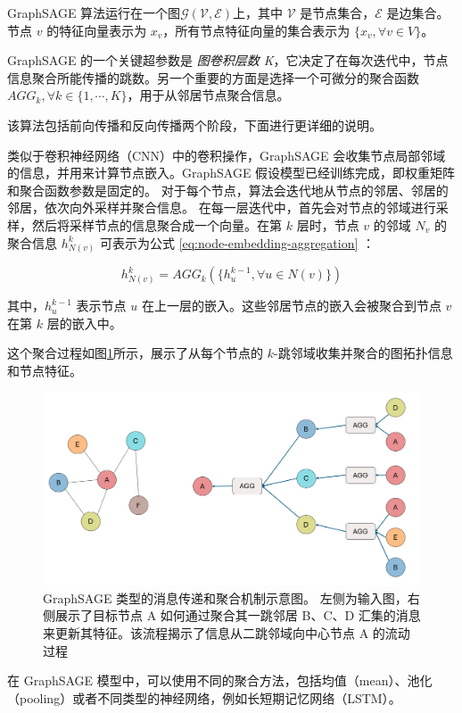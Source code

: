 \documentclass{article}
\begin{document}
GraphSAGE 算法运行在一个图$\mathcal{G(V, E)}$上，其中 $\mathcal{V}$ 是节点集合，$\mathcal{E}$ 是边集合。节点 $v$ 的特征向量表示为 $x_v$，所有节点特征向量的集合表示为 $\{x_v, \forall v \in V\}$。

GraphSAGE 的一个关键超参数是 \textit{图卷积层数 K}，它决定了在每次迭代中，节点信息聚合所能传播的跳数。另一个重要的方面是选择一个可微分的聚合函数$AGG_k,\forall k \in \{1,\cdots,K\}$，用于从邻居节点聚合信息。

该算法包括前向传播和反向传播两个阶段，下面进行更详细的说明。

类似于卷积神经网络（CNN）中的卷积操作，GraphSAGE 会收集节点局部邻域的信息，并用来计算节点嵌入。GraphSAGE 假设模型已经训练完成，即权重矩阵和聚合函数参数是固定的。
对于每个节点，算法会迭代地从节点的邻居、邻居的邻居，依次向外采样并聚合信息。
在每一层迭代中，首先会对节点的邻域进行采样，然后将采样节点的信息聚合成一个向量。在第 $k$ 层时，节点 $v$ 的邻域 $N_v$ 的聚合信息 $h_{N(v)}^k$ 可表示为公式 \eqref{eq:node-embedding-aggregation} \cite{Kumar2020}：

\begin{equation}
 h_{N(v)}^k=AGG_k (\{h_u^{k-1},\forall u \in N(v)\})
 \label{eq:node-embedding-aggregation}
\end{equation}

其中，$h_u^{k-1}$ 表示节点 $u$ 在上一层的嵌入。这些邻居节点的嵌入会被聚合到节点 $v$ 在第 $k$ 层的嵌入中。

这个聚合过程如图\ref{fig:graph-aggration}所示，展示了从每个节点的 $k$-跳邻域收集并聚合的图拓扑信息和节点特征。


\begin{figure}[h]
    \centering
    \includegraphics[width=0.6\linewidth]{images/graph-aggration.png}
    \caption{GraphSAGE 类型的消息传递和聚合机制示意图。 左侧为输入图，右侧展示了目标节点 A 如何通过聚合其一跳邻居 B、C、D 汇集的消息来更新其特征。该流程揭示了信息从二跳邻域向中心节点 A 的流动过程}
    \label{fig:graph-aggration}
\end{figure}

在 GraphSAGE 模型中，可以使用不同的聚合方法，包括均值（mean）、池化（pooling）或者不同类型的神经网络，例如长短期记忆网络（LSTM）\cite{hamilton2018inductiverepresentationlearninglarge}。
\end{document}

